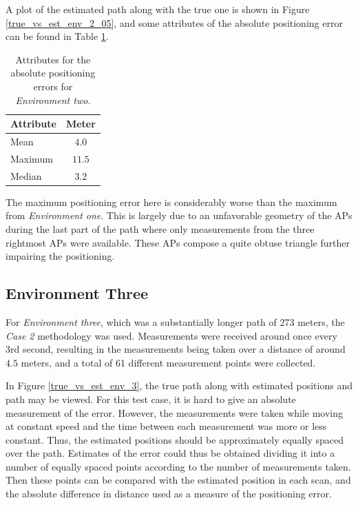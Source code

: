 \documentclass{LTHthesis}
\begin{document}
A plot of the estimated path along with the true one is shown in Figure \ref{true_vs_est_env_2_05}, and some attributes of the absolute positioning error can be found in Table \ref{table:error_env_2}.


\begin{table}[!hbt]
\begin{center}
\begin{tabular}{|l|c|}
\hline
\multicolumn{1}{|c|}{Attribute} & Meter \\
\hline
\hline
Mean & $4.0$ \\
\hline
Maximum & $11.5$\\
\hline
Median & $3.2$ \\
\hline 
\end{tabular}
\end{center}
\caption{Attributes for the absolute positioning errors for \emph{Environment two}.}\label{table:error_env_2}
\end{table}



The maximum positioning error here is considerably worse than the maximum from \emph{Environment one}. This is largely due to an unfavorable geometry of the APs during the last part of the path where only measurements from the three rightmost APs were available. These APs compose a quite obtuse triangle further impairing the positioning.  
%
\subsection{Environment Three}
%
For \emph{Environment three}, which was a substantially longer path of 273 meters, the \emph{Case 2} methodology was used. Measurements were received around once every 3rd second, resulting in the measurements being taken over a distance of around $4.5$ meters, and a total of 61 different measurement points were collected. 

In Figure \ref{true_vs_est_env_3}, the true path along with estimated positions and path may be viewed. For this test case, it is hard to give an absolute measurement of the error. However, the measurements were taken while moving at constant speed and the time between each measurement was more or less constant. Thus, the estimated positions should be approximately equally spaced over the path. Estimates of the error could thus be obtained dividing it into a number of equally spaced points according to the number of measurements taken. Then these points can be compared with the estimated position in each scan, and the absolute difference in distance used as a measure of the positioning error.
\end{document}
